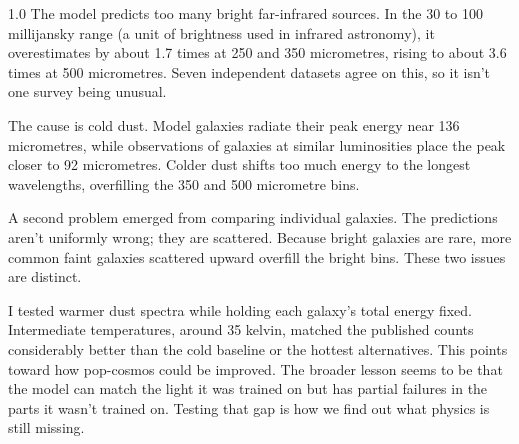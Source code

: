 \documentclass[12pt,a4paper]{article}
\begin{document}
\begin{spacing}{1.0}
The model predicts too many bright far-infrared sources. In the 30 to 100 millijansky
range (a unit of brightness used in infrared astronomy), it overestimates by about 1.7 times at 250 and 350 micrometres, rising to about
3.6 times at 500 micrometres. Seven independent datasets agree on this, so it isn't one
survey being unusual.

The cause is cold dust. Model galaxies radiate their peak energy near 136 micrometres,
while observations of galaxies at similar luminosities place the peak closer to 92
micrometres. Colder dust shifts too much energy to the longest wavelengths, overfilling
the 350 and 500 micrometre bins.

A second problem emerged from comparing individual galaxies. The predictions aren't
uniformly wrong; they are scattered. Because bright galaxies are rare, more common faint galaxies scattered upward overfill the bright bins. These two issues are
distinct.

I tested warmer dust spectra while holding each galaxy's total energy fixed.
Intermediate temperatures, around 35 kelvin, matched the published counts considerably
better than the cold baseline or the hottest alternatives. This points toward how pop-cosmos could be improved. The broader lesson seems to be that the model can
match the light it was trained on but has partial failures in the parts it wasn't trained on.
Testing that gap is how we find out what physics is still missing.

\end{spacing}
\restoregeometry
\end{document}
